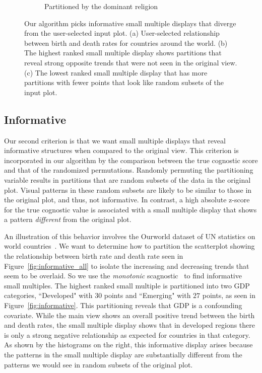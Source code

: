 \begin{figure}[t]
\begin{subfigure}{3in}
        \vspace{-0.5cm}
		  \caption{Partitioned by the dominant religion}
		 \label{fig:not_informative}
	 \end{subfigure}
	  \caption{Our algorithm picks informative small multiple displays that diverge from the user-selected input plot. (a) User-selected relationship between birth and death rates for countries around the world. (b) The highest ranked small multiple display shows partitions that reveal strong opposite trends that were not seen in the original view. (c) The lowest ranked small multiple display that has more partitions with fewer points that look like random subsets of the input plot.}
\end{figure}

\subsection{Informative}
Our second criterion is that we want small multiple displays that reveal informative structures when compared to the original view. This criterion is incorporated in our algorithm by the comparison between the true cognostic score and that of the randomized permutations. Randomly permuting the partitioning variable results in partitions that are random subsets of the data in the original plot. Visual patterns in these random subsets are likely to be similar to those in the original plot, and thus, not informative. In contrast, a high absolute z-score for the true cognostic value is associated with a small multiple display that shows a pattern \emph{different} from the original plot.

An illustration of this behavior involves the Ourworld dataset of UN statistics on world countries~\cite{Wilkinson2005GG}. We want to determine how to partition the scatterplot showing the relationship between birth rate and death rate seen in Figure~\ref{fig:informative_all} to isolate the increasing and decreasing trends that seem to be overlaid. So we use the \emph{monotonic} scagnostic~\cite{Wilkinson2005} to find informative small multiples. The highest ranked small multiple is partitioned into two GDP categories, ``Developed" with $30$ points and ``Emerging" with $27$ points, as seen in Figure~\ref{fig:informative}. This partitioning reveals that GDP is a confounding covariate. While the main view shows an overall positive trend between the birth and death rates, the small multiple display shows that in developed regions there is only a strong negative relationship as expected for countries in that category. As shown by the histograms on the right, this informative display arises because the patterns in the small multiple display are substantially different from the patterns we would see in random subsets of the original plot.

